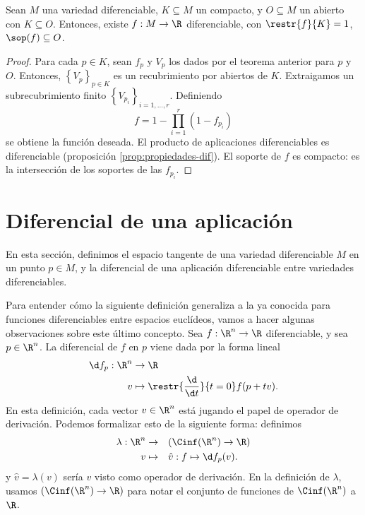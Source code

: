 \begin{ncor}
  Sean $M$ una variedad diferenciable, $K\subseteq M$ un compacto, y $O\subseteq
  M$ un abierto con $K\subseteq O$. Entonces, existe $f:M\to\R$ diferenciable,
  con $\restr{f}{K} = 1$, $\sop(f)\subseteq O$.
\end{ncor}
\begin{proof}
  Para cada $p\in K$, sean $f_{p}$ y $V_{p}$ los dados por el teorema anterior
  para $p$ y $O$. Entonces, $\left\{ V_{p} \right\}_{p\in K}$ es un
  recubrimiento por abiertos de $K$. Extraigamos un subrecubrimiento finito
  $\left\{ V_{p_{i}} \right\}_{i=1,\dots,r}$. Definiendo
  \[
    f = 1 - \prod_{i=1}^{r}(1-f_{p_{i}})
  \]
  se obtiene la función deseada. El producto de aplicaciones diferenciables es
  diferenciable (proposición \ref{prop:propiedades-dif}). El soporte de $f$ es
  compacto: es la intersección de los soportes de las $f_{p_{i}}$.
\end{proof}

\section{Diferencial de una aplicación}

En esta sección, definimos el espacio tangente de una variedad diferenciable $M$
en un punto $p\in M$, y la diferencial de una aplicación diferenciable entre
variedades diferenciables.

Para entender cómo la siguiente definición generaliza a la ya conocida para
funciones diferenciables entre espacios euclídeos, vamos a hacer algunas
observaciones sobre este último concepto. Sea $f:\R^{n}\to\R$ diferenciable, y
sea $p\in\R^{n}$. La diferencial de $f$ en $p$ viene dada por la forma lineal
\begin{alignat*}{2}
  \d f_{p}: \R^{n} & \to \R \\
  v & \mapsto \restr{\frac{\d}{\d t}}{t = 0}f(p+tv).
\end{alignat*}
En esta definición, cada vector $v\in \R^{n}$ está jugando el papel de operador
de derivación. Podemos formalizar esto de la siguiente forma: definimos
\begin{alignat*}{3}
  \lambda: \R^{n} & \to && (\Cinf(\R^{n})\to\R)   \\
               v & \mapsto && \hat{v}: f \mapsto \d f_{p}(v).
\end{alignat*}
y $\hat{v} = \lambda(v)$ sería $v$ visto como operador de derivación. En la
definición de $\lambda$, usamos $(\Cinf(\R^{n})\to\R)$ para notar el conjunto de
funciones de $\Cinf(\R^{n})$ a $\R$.

